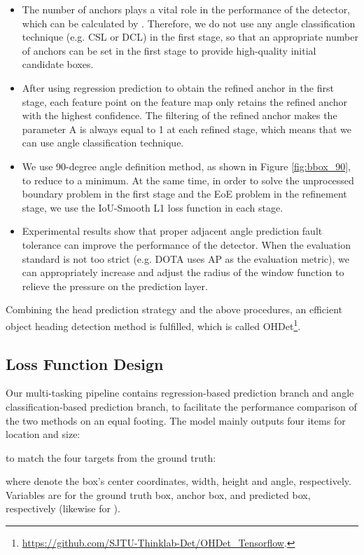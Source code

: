 \documentclass[10pt,journal,compsoc]{IEEEtran}
\begin{document}
\begin{itemize}
	\item The number of anchors plays a vital role in the performance of the detector, which can be calculated by . Therefore, we do not use any angle classification technique (e.g. CSL or DCL) in the first stage, so that an appropriate number of anchors can be set in the first stage to provide high-quality initial candidate boxes.
	\item After using regression prediction to obtain the refined anchor in the first stage, each feature point on the feature map only retains the refined anchor with the highest confidence. The filtering of the refined anchor makes the parameter A is always equal to 1 at each refined stage, which means that we can use angle classification technique.
	\item We use 90-degree angle definition method, as shown in Figure \ref{fig:bbox_90}, to reduce  to a minimum. At the same time, in order to solve the unprocessed boundary problem in the first stage and the EoE problem in the refinement stage, we use the IoU-Smooth L1 loss function \cite{yang2019scrdet} in each stage.
	\item Experimental results show that proper adjacent angle prediction fault tolerance can improve the performance of the detector. When the evaluation standard is not too strict (e.g. DOTA uses AP as the evaluation metric), we can appropriately increase  and adjust the radius  of the window function to relieve the pressure on the prediction layer.

\end{itemize}

Combining the head prediction strategy and the above procedures, an efficient object heading detection method is fulfilled, which is called OHDet\footnote{\url{https://github.com/SJTU-Thinklab-Det/OHDet_Tensorflow}.}.

\subsection{Loss Function Design}\label{sec:loss}
Our multi-tasking pipeline contains regression-based prediction branch and angle classification-based prediction branch, to facilitate the performance comparison of the two methods on an equal footing. The model mainly outputs four items for location and size:

to match the four targets from the ground truth:

where  denote the box's center coordinates, width, height and angle, respectively. Variables  are for the ground truth box, anchor box, and predicted box, respectively (likewise for ).
\end{document}
